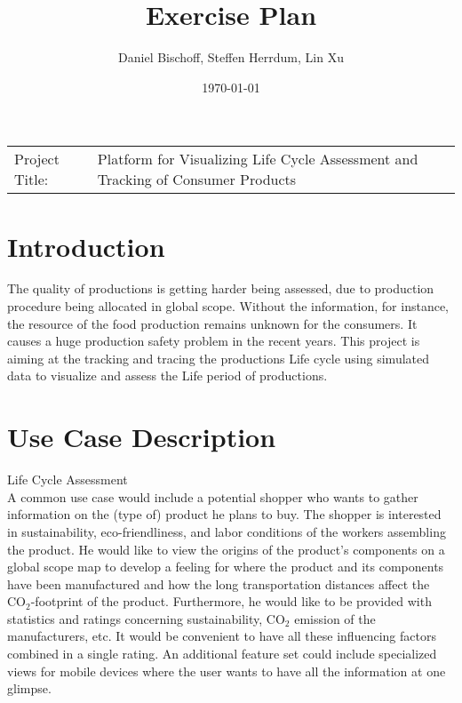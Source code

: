 \documentclass[a4page]{article}
\author{Daniel Bischoff, Steffen Herrdum, Lin Xu}
\title{Exercise Plan}
\date{\today}
\begin{document}
\maketitle

\begin{table}[!th]
\begin{tabular}{l p{}}

Project Title: & Platform for Visualizing Life Cycle Assessment and Tracking of Consumer Products \\

\end{tabular}
\end{table}

\section{Introduction}
The quality of productions is getting harder being assessed, due to production procedure being allocated in global scope.
Without the information, for instance, the resource of the food production remains unknown for the consumers.
It causes a huge production safety problem in the recent years.
This project is aiming at the tracking and tracing the productions Life cycle using simulated data to visualize and assess the Life period of productions. 

\section{Use Case Description}

Life Cycle Assessment\\
A common use case would include a potential shopper who wants to gather information on the (type of) product he plans to buy.
The shopper is interested in sustainability, eco-friendliness, and labor conditions of the workers assembling the product.
He would like to view the origins of the product's components on a global scope map to develop a feeling for where the product and its components have been manufactured and how the long transportation distances affect the $\mathrm{CO}_2$-footprint of the product.
Furthermore, he would like to be provided with statistics and ratings concerning sustainability, $\mathrm{CO}_2$ emission of the manufacturers, etc.
It would be convenient to have all these influencing factors combined in a single rating.
An additional feature set could include specialized views for mobile devices where the user wants to have all the information at one glimpse.
\end{document}
